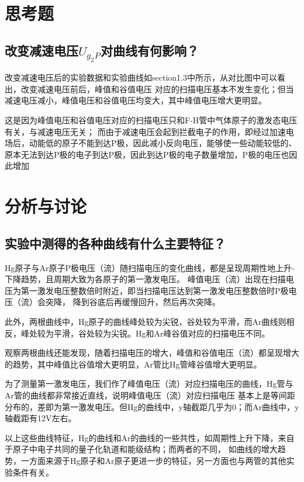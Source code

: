 \documentclass{article}
\begin{document}
    \section{思考题}
    \subsection{改变减速电压$U_{g_2P}$对曲线有何影响？}
    改变减速电压后的实验数据和实验曲线如section1.3中所示，从对比图中可以看出，改变减速电压前后，峰值和谷值电压
    对应的扫描电压基本不发生变化；但当减速电压减小，峰值电压和谷值电压均变大，其中峰值电压增大更明显。

    这是因为峰值电压和谷值电压对应的扫描电压只和F-H管中气体原子的激发态电压有关，与减速电压无关；
    而由于减速电压会起到拦截电子的作用，即经过加速电场后，动能低的原子不能到达P极，因此减小反向电压，能够使一些动能较低的、
    原本无法到达P极的电子到达P极，因此到达P极的电子数量增加，P极的电压也因此增加

    \section{分析与讨论}
    \subsection{实验中测得的各种曲线有什么主要特征？}
    Hg原子与Ar原子P极电压（流）随扫描电压的变化曲线，都是呈现周期性地上升-下降趋势，且周期大致为各原子的第一激发电压。
    峰值电压（流）出现在扫描电压为第一激发电压整数倍时附近，即当扫描电压达到第一激发电压整数倍时P极电压（流）会突降，
    降到谷底后再缓慢回升，然后再次突降。

    此外，两根曲线中，Hg原子的曲线峰处较为尖锐，谷处较为平滑，而Ar曲线则相反，峰处较为平滑，谷处较为尖锐。Hg和Ar峰谷值对应的扫描电压不同。

    观察两根曲线还能发现，随着扫描电压的增大，峰值和谷值电压（流）都呈现增大的趋势，其中峰值比谷值增大更明显，Ar管比Hg管峰谷值增大更明显。

    为了测量第一激发电压，我们作了峰值电压（流）对应扫描电压的曲线，Hg管与Ar管的曲线都非常接近直线，说明峰值电压（流）对应扫描电压
    基本上是等间距分布的，差即为第一激发电压。但Hg的曲线中，y轴截距几乎为0；而Ar曲线中，y轴截距有12V左右。

    以上这些曲线特征，Hg的曲线和Ar的曲线的一些共性，如周期性上升下降，来自于原子中电子共同的量子化轨道和能级结构；而两者的不同，
    如曲线的增大趋势，一方面来源于Hg原子和Ar原子更进一步的特征，另一方面也与两管的其他实验条件有关。
\end{document}
